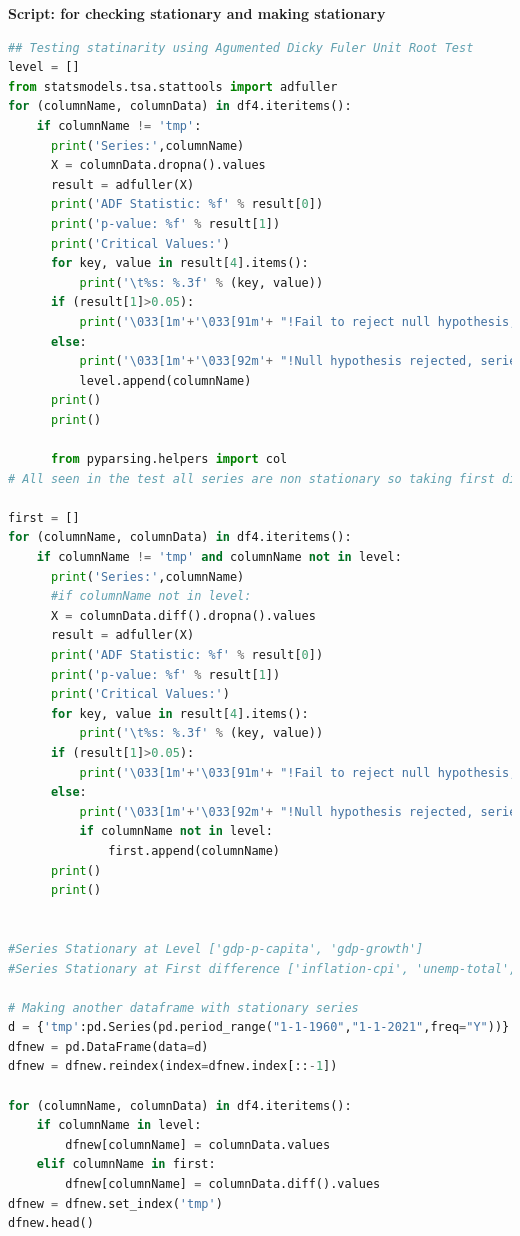 \vspace{10mm}
\textbf{Script: for checking stationary and making stationary}\\
\begin{lstlisting}[language=Python]
## Testing statinarity using Agumented Dicky Fuler Unit Root Test
level = []
from statsmodels.tsa.stattools import adfuller
for (columnName, columnData) in df4.iteritems():
    if columnName != 'tmp':
      print('Series:',columnName)
      X = columnData.dropna().values
      result = adfuller(X)
      print('ADF Statistic: %f' % result[0])
      print('p-value: %f' % result[1])
      print('Critical Values:')
      for key, value in result[4].items():
          print('\t%s: %.3f' % (key, value))
      if (result[1]>0.05):
          print('\033[1m'+'\033[91m'+ "!Fail to reject null hypothesis, series not stationary!"+'\033[0m')
      else:
          print('\033[1m'+'\033[92m'+ "!Null hypothesis rejected, series is stationary!"+'\033[0m')
          level.append(columnName)
      print()
      print()

      from pyparsing.helpers import col
# All seen in the test all series are non stationary so taking first difference and then check the statinarity

first = [] 
for (columnName, columnData) in df4.iteritems(): 
    if columnName != 'tmp' and columnName not in level:  
      print('Series:',columnName)
      #if columnName not in level:
      X = columnData.diff().dropna().values
      result = adfuller(X)
      print('ADF Statistic: %f' % result[0])
      print('p-value: %f' % result[1])
      print('Critical Values:')
      for key, value in result[4].items():
          print('\t%s: %.3f' % (key, value))
      if (result[1]>0.05):
          print('\033[1m'+'\033[91m'+ "!Fail to reject null hypothesis, series not stationary!"+'\033[0m')
      else:
          print('\033[1m'+'\033[92m'+ "!Null hypothesis rejected, series is stationary!"+'\033[0m')
          if columnName not in level:
              first.append(columnName)
      print()
      print()


#Series Stationary at Level ['gdp-p-capita', 'gdp-growth']
#Series Stationary at First difference ['inflation-cpi', 'unemp-total', 'p-remittances']

# Making another dataframe with stationary series
d = {'tmp':pd.Series(pd.period_range("1-1-1960","1-1-2021",freq="Y"))}
dfnew = pd.DataFrame(data=d)
dfnew = dfnew.reindex(index=dfnew.index[::-1])

for (columnName, columnData) in df4.iteritems():
    if columnName in level:
        dfnew[columnName] = columnData.values
    elif columnName in first:
        dfnew[columnName] = columnData.diff().values
dfnew = dfnew.set_index('tmp')
dfnew.head() 

\end{lstlisting}


